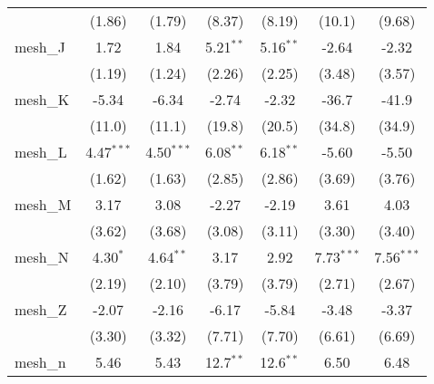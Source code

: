 \begin{tabular}{lcccccc}
                                                               & (1.86)         & (1.79)         & (8.37)        & (8.19)        & (10.1)        & (9.68)\\   
   mesh\_J                                                     & 1.72           & 1.84           & 5.21$^{**}$   & 5.16$^{**}$   & -2.64         & -2.32\\   
                                                               & (1.19)         & (1.24)         & (2.26)        & (2.25)        & (3.48)        & (3.57)\\   
   mesh\_K                                                     & -5.34          & -6.34          & -2.74         & -2.32         & -36.7         & -41.9\\   
                                                               & (11.0)         & (11.1)         & (19.8)        & (20.5)        & (34.8)        & (34.9)\\   
   mesh\_L                                                     & 4.47$^{***}$   & 4.50$^{***}$   & 6.08$^{**}$   & 6.18$^{**}$   & -5.60         & -5.50\\   
                                                               & (1.62)         & (1.63)         & (2.85)        & (2.86)        & (3.69)        & (3.76)\\   
   mesh\_M                                                     & 3.17           & 3.08           & -2.27         & -2.19         & 3.61          & 4.03\\   
                                                               & (3.62)         & (3.68)         & (3.08)        & (3.11)        & (3.30)        & (3.40)\\   
   mesh\_N                                                     & 4.30$^{*}$     & 4.64$^{**}$    & 3.17          & 2.92          & 7.73$^{***}$  & 7.56$^{***}$\\   
                                                               & (2.19)         & (2.10)         & (3.79)        & (3.79)        & (2.71)        & (2.67)\\   
   mesh\_Z                                                     & -2.07          & -2.16          & -6.17         & -5.84         & -3.48         & -3.37\\   
                                                               & (3.30)         & (3.32)         & (7.71)        & (7.70)        & (6.61)        & (6.69)\\   
   mesh\_n                                                     & 5.46           & 5.43           & 12.7$^{**}$   & 12.6$^{**}$   & 6.50          & 6.48\\   

\end{tabular}
